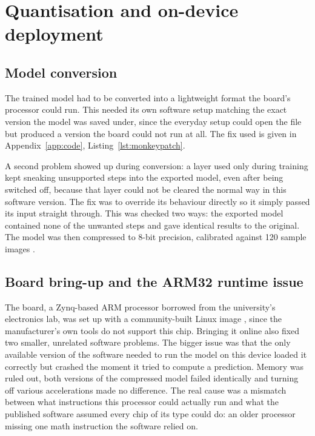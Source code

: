 \section{Quantisation and on-device deployment}

\subsection{Model conversion}
\label{sec:method-conversion}

The trained model had to be converted into a lightweight format the board's processor could run. This needed its own software setup matching the exact version the model was saved under, since the everyday setup could open the file but produced a version the board could not run at all. The fix used is given in Appendix~\ref{app:code}, Listing~\ref{lst:monkeypatch}.

A second problem showed up during conversion: a layer used only during training kept sneaking unsupported steps into the exported model, even after being switched off, because that layer could not be cleared the normal way in this software version. The fix was to override its behaviour directly so it simply passed its input straight through. This was checked two ways: the exported model contained none of the unwanted steps and gave identical results to the original. The model was then compressed to 8-bit precision, calibrated against 120 sample images \citep{tensorflowlite}.

\subsection{Board bring-up and the ARM32 runtime issue}
\label{sec:arm32-issue}

The board, a Zynq-based ARM processor borrowed from the university's electronics lab, was set up with a community-built Linux image \citep{pynq}, since the manufacturer's own tools do not support this chip. Bringing it online also fixed two smaller, unrelated software problems. The bigger issue was that the only available version of the software needed to run the model on this device loaded it correctly but crashed the moment it tried to compute a prediction. Memory was ruled out, both versions of the compressed model failed identically and turning off various accelerations made no difference. The real cause was a mismatch between what instructions this processor could actually run and what the published software assumed every chip of its type could do: an older processor missing one math instruction the software relied on.


